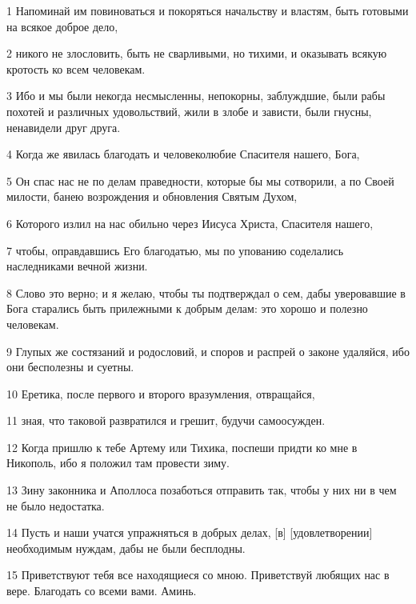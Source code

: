 \par 1 Напоминай им повиноваться и покоряться начальству и властям, быть готовыми на всякое доброе дело,
\par 2 никого не злословить, быть не сварливыми, но тихими, и оказывать всякую кротость ко всем человекам.
\par 3 Ибо и мы были некогда несмысленны, непокорны, заблуждшие, были рабы похотей и различных удовольствий, жили в злобе и зависти, были гнусны, ненавидели друг друга.
\par 4 Когда же явилась благодать и человеколюбие Спасителя нашего, Бога,
\par 5 Он спас нас не по делам праведности, которые бы мы сотворили, а по Своей милости, банею возрождения и обновления Святым Духом,
\par 6 Которого излил на нас обильно через Иисуса Христа, Спасителя нашего,
\par 7 чтобы, оправдавшись Его благодатью, мы по упованию соделались наследниками вечной жизни.
\par 8 Слово это верно; и я желаю, чтобы ты подтверждал о сем, дабы уверовавшие в Бога старались быть прилежными к добрым делам: это хорошо и полезно человекам.
\par 9 Глупых же состязаний и родословий, и споров и распрей о законе удаляйся, ибо они бесполезны и суетны.
\par 10 Еретика, после первого и второго вразумления, отвращайся,
\par 11 зная, что таковой развратился и грешит, будучи самоосужден.
\par 12 Когда пришлю к тебе Артему или Тихика, поспеши придти ко мне в Никополь, ибо я положил там провести зиму.
\par 13 Зину законника и Аполлоса позаботься отправить так, чтобы у них ни в чем не было недостатка.
\par 14 Пусть и наши учатся упражняться в добрых делах, [в] [удовлетворении] необходимым нуждам, дабы не были бесплодны.
\par 15 Приветствуют тебя все находящиеся со мною. Приветствуй любящих нас в вере. Благодать со всеми вами. Аминь.


